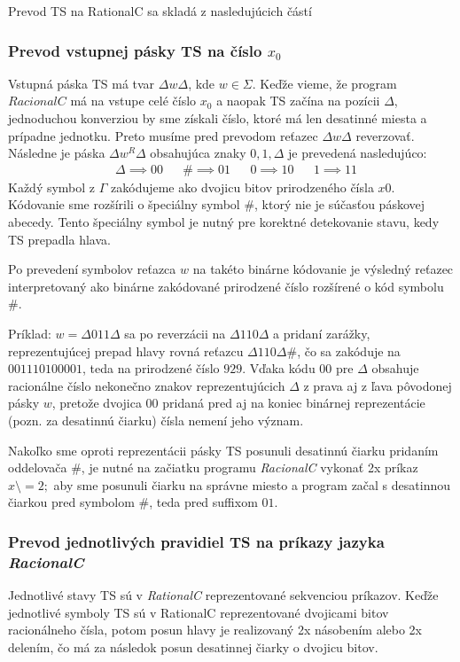 \documentclass[10pt]{article}
\begin{document}
Prevod TS na RationalC sa skladá z nasledujúcich částí
\subsubsection*{Prevod vstupnej pásky TS na číslo $x_0$}
    Vstupná páska TS má tvar $\Delta w \Delta$, kde $w \in \Sigma$. Keďže vieme, že program
    $RacionalC$ má na vstupe celé číslo $x_0$ a naopak TS začína na pozícii $\Delta$, jednoduchou konverziou by sme získali číslo,
    ktoré má len desatinné miesta a prípadne jednotku. Preto musíme
    pred prevodom reťazec $\Delta w \Delta$ reverzovať. 
    Následne je páska $\Delta w^R \Delta$ obsahujúca znaky $0,1,\Delta$ je prevedená nasledujúco:
    \begin{align*}
        &\Delta \implies 00 &  & \#  \implies 01 &
        &0 \implies 10 &  &1 \implies 11 
    \end{align*}
    Každý symbol z $\Gamma$ zakódujeme ako dvojicu bitov prirodzeného čísla $x0$.
    Kódovanie sme rozšírili o špeciálny symbol $\#$, ktorý nie je súčasťou páskovej abecedy.
    Tento špeciálny symbol je nutný pre korektné detekovanie stavu, kedy TS prepadla hlava.

    Po prevedení symbolov reťazca $w$ na takéto binárne kódovanie je výsledný reťazec interpretovaný ako
    binárne zakódované prirodzené číslo rozšírené o kód symbolu $\#$.

    Príklad: $w = \Delta011\Delta$ sa po reverzácii na $\Delta110\Delta$ a pridaní zarážky,
    reprezentujúcej prepad hlavy rovná reťazcu $\Delta110\Delta \#$, čo sa zakóduje na $00 11 10 10 00
    01$, teda na prirodzené číslo $929$. Vďaka kódu $00$ pre $\Delta$ obsahuje racionálne číslo nekonečno znakov
    reprezentujúcich $\Delta$ z prava aj z ľava pôvodonej pásky $w$, pretože dvojica 00 pridaná
    pred aj na koniec binárnej reprezentácie (pozn. za desatinnú čiarku) čísla nemení jeho význam.

    Nakoľko sme oproti reprezentácii pásky TS posunuli desatinnú čiarku pridaním oddelovača $\#$, je
    nutné na začiatku programu \textit{RacionalC} vykonať 2x príkaz $x \setminus = 2;$ aby sme posunuli čiarku na
    správne miesto a program začal s desatinnou čiarkou pred symbolom $\#$, teda pred suffixom $01$.

\subsubsection*{Prevod jednotlivých pravidiel TS na príkazy jazyka \textit{RacionalC}}
    Jednotlivé stavy TS sú v \textit{RationalC} reprezentované sekvenciou príkazov. 
    Keďže jednotlivé symboly TS sú v RationalC reprezentované dvojicami bitov racionálneho čísla, potom posun hlavy je
    realizovaný 2x násobením alebo 2x delením, čo má za následok posun desatinnej čiarky o
    dvojicu bitov.
\end{document}
